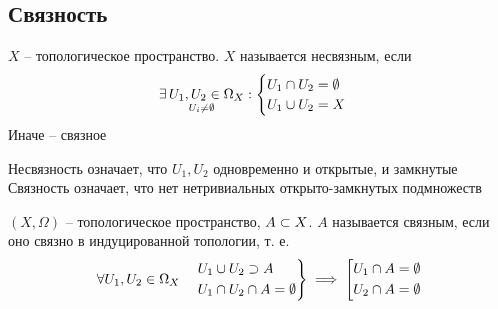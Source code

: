 \chapter{}

\section{Связность}

\begin{definition}
    $ X $ -- топологическое пространство. $ X $ называется несвязным, если
    $$ \underset{U_i \ne \emptyset}{\exists\, U_1, U_2 \in \Omega_X} :
    \begin{cases}
    	U_1 \cap U_2 = \emptyset \\
        U_1 \cup U_2 = X
    \end{cases} $$
    Иначе -- связное
\end{definition}

\begin{remark}
	Несвязность означает, что $ U_1, U_2 $ одновременно и открытые, и замкнутые \\
    Связность означает, что нет нетривиальных открыто-замкнутых подмножеств
\end{remark}

\begin{definition}
	$ (X, \Omega) $ -- топологическое пространство, $ A \subset X $. $ A $ называется связным, если оно связно в индуцированной топологии, т. е.
    $$ \forall U_1, U_2 \in \Omega_X \quad
    \begin{rcases}
    	U_1 \cup U_2 \supset A \\
        U_1 \cap U_2 \cap A = \emptyset
    \end{rcases} \implies \left[
    \begin{aligned}
    	U_1 \cap A = \emptyset \\
        U_2 \cap A = \emptyset
    \end{aligned} \right. $$
\end{definition}

